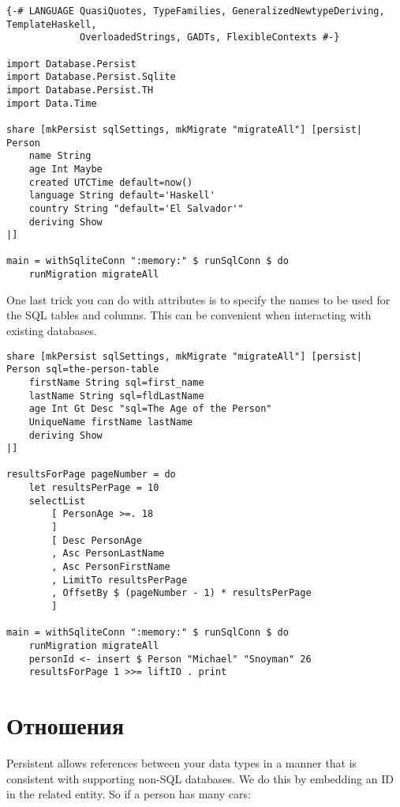 \begin{lstlisting}
{-# LANGUAGE QuasiQuotes, TypeFamilies, GeneralizedNewtypeDeriving, TemplateHaskell,
             OverloadedStrings, GADTs, FlexibleContexts #-}

import Database.Persist
import Database.Persist.Sqlite
import Database.Persist.TH
import Data.Time

share [mkPersist sqlSettings, mkMigrate "migrateAll"] [persist|
Person
    name String
    age Int Maybe
    created UTCTime default=now()
    language String default='Haskell'
    country String "default='El Salvador'"
    deriving Show
|]

main = withSqliteConn ":memory:" $ runSqlConn $ do
    runMigration migrateAll
\end{lstlisting}
 
One last trick you can do with attributes is to specify the names to be used for the SQL tables and columns. This can be convenient when interacting with existing databases.

\begin{lstlisting}
share [mkPersist sqlSettings, mkMigrate "migrateAll"] [persist|
Person sql=the-person-table
    firstName String sql=first_name
    lastName String sql=fldLastName
    age Int Gt Desc "sql=The Age of the Person"
    UniqueName firstName lastName
    deriving Show
|]

resultsForPage pageNumber = do
    let resultsPerPage = 10
    selectList
        [ PersonAge >=. 18
        ]
        [ Desc PersonAge
        , Asc PersonLastName
        , Asc PersonFirstName
        , LimitTo resultsPerPage
        , OffsetBy $ (pageNumber - 1) * resultsPerPage
        ]

main = withSqliteConn ":memory:" $ runSqlConn $ do
    runMigration migrateAll
    personId <- insert $ Person "Michael" "Snoyman" 26
    resultsForPage 1 >>= liftIO . print
\end{lstlisting}

\section{Отношения} %

Persistent allows references between your data types in a manner that is consistent with supporting non-SQL databases. We do this by embedding an ID in the related entity. So if a person has many cars:

